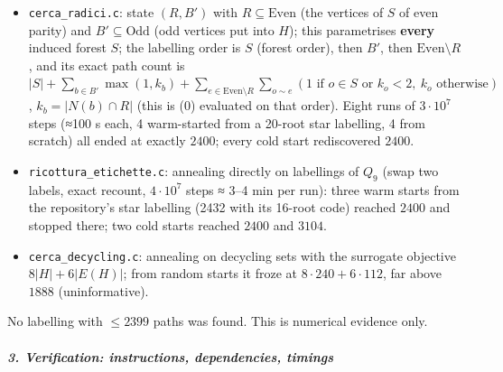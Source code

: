 \documentclass[11pt,a4paper]{article}
\providecommand{\tightlist}{\setlength{\itemsep}{0pt}\setlength{\parskip}{0pt}}
\begin{document}
\begin{itemize}
\tightlist
\item
  \texttt{cerca\_radici.c}: state \((R,B')\) with
  \(R\subseteq\text{Even}\) (the vertices of \(S\) of even parity) and
  \(B'\subseteq\text{Odd}\) (odd vertices put into \(H\)); this
  parametrises \textbf{every} induced forest \(S\); the labelling order
  is \(S\) (forest order), then \(B'\), then \(\text{Even}\setminus R\),
  and its exact path count is
  \(|S|+\sum_{b\in B'}\max(1,k_b)+\sum_{e\in\text{Even}\setminus R}\sum_{o\sim e}(\text{1 if }o\in S\text{ or }k_o<2,\ k_o\text{ otherwise})\),
  \(k_b=|N(b)\cap R|\) (this is (0) evaluated on that order). Eight runs
  of \(3\cdot10^7\) steps (≈100 s each, 4 warm-started from a 20-root
  star labelling, 4 from scratch) all ended at exactly \(2400\); every
  cold start rediscovered \(2400\).
\item
  \texttt{ricottura\_etichette.c}: annealing directly on labellings of
  \(Q_9\) (swap two labels, exact recount, \(4\cdot10^7\) steps ≈ 3--4
  min per run): three warm starts from the repository's star labelling
  (2432 with its 16-root code) reached \(2400\) and stopped there; two
  cold starts reached \(2400\) and \(3104\).
\item
  \texttt{cerca\_decycling.c}: annealing on decycling sets with the
  surrogate objective \(8|H|+6|E(H)|\); from random starts it froze at
  \(8\cdot240+6\cdot112\), far above \(1888\) (uninformative).
\end{itemize}

No labelling with \(\le2399\) paths was found. This is numerical
evidence only.

\subparagraph{3. Verification: instructions, dependencies,
timings}\label{verification-instructions-dependencies-timings}
\end{document}
